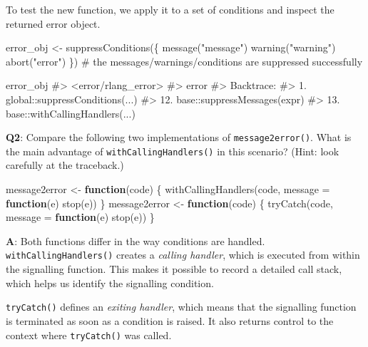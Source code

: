 \documentclass[
]{krantz}
\makeatletter
\newenvironment{Shaded}{\begin{snugshade}}{\end{snugshade}}
\newcommand{\CommentTok}[1]{\textcolor[rgb]{0.56,0.35,0.01}{\textit{#1}}}
\newcommand{\ControlFlowTok}[1]{\textcolor[rgb]{0.13,0.29,0.53}{\textbf{#1}}}
\newcommand{\DataTypeTok}[1]{\textcolor[rgb]{0.13,0.29,0.53}{#1}}
\newcommand{\KeywordTok}[1]{\textcolor[rgb]{0.13,0.29,0.53}{\textbf{#1}}}
\newcommand{\NormalTok}[1]{#1}
\newcommand{\StringTok}[1]{\textcolor[rgb]{0.31,0.60,0.02}{#1}}
\newenvironment{kframe}{%
\medskip{}
\setlength{\fboxsep}{.8em}
 \def\at@end@of@kframe{}%
 \ifinner\ifhmode%
  \def\at@end@of@kframe{\end{minipage}}%
  \begin{minipage}{\columnwidth}%
 \fi\fi%
 \def\FrameCommand##1{\hskip\@totalleftmargin \hskip-\fboxsep
 \colorbox{shadecolor}{##1}\hskip-\fboxsep
     \hskip-\linewidth \hskip-\@totalleftmargin \hskip\columnwidth}%
 \MakeFramed {\advance\hsize-\width
   \@totalleftmargin\z@ \linewidth\hsize
   \@setminipage}}%
 {\par\unskip\endMakeFramed%
 \at@end@of@kframe}
\renewenvironment{Shaded}{\begin{kframe}}{\end{kframe}}
\renewcommand{\KeywordTok} [1]{\textcolor[rgb]{0.00,0.44,0.13}{{#1}}}
\renewcommand{\DataTypeTok}[1]{\textcolor[rgb]{0.56,0.13,0.00}{{#1}}}
\renewcommand{\StringTok}  [1]{\textcolor[rgb]{0.25,0.44,0.63}{{#1}}}
\renewcommand{\CommentTok} [1]{\textcolor[rgb]{0.38,0.63,0.69}{{#1}}}
\renewcommand{\NormalTok}  [1]{{#1}}
\makeatother
\begin{document}
To test the new function, we apply it to a set of conditions and inspect the returned error object.

\begin{Shaded}
\begin{Highlighting}[]
\NormalTok{error_obj <-}\StringTok{ }\KeywordTok{suppressConditions}\NormalTok{(\{}
  \KeywordTok{message}\NormalTok{(}\StringTok{"message"}\NormalTok{)}
  \KeywordTok{warning}\NormalTok{(}\StringTok{"warning"}\NormalTok{)}
  \KeywordTok{abort}\NormalTok{(}\StringTok{"error"}\NormalTok{)}
\NormalTok{\})}
\CommentTok{# the messages/warnings/conditions are suppressed successfully}

\NormalTok{error_obj}
\CommentTok{#> <error/rlang_error>}
\CommentTok{#> error}
\CommentTok{#> Backtrace:}
\CommentTok{#>   1. global::suppressConditions(...)}
\CommentTok{#>  12. base::suppressMessages(expr)}
\CommentTok{#>  13. base::withCallingHandlers(...)}
\end{Highlighting}
\end{Shaded}

\textbf{{Q2}}: Compare the following two implementations of \texttt{message2error()}. What is the main advantage of \texttt{withCallingHandlers()} in this scenario? (Hint: look carefully at the traceback.)

\begin{Shaded}
\begin{Highlighting}[]
\NormalTok{message2error <-}\StringTok{ }\ControlFlowTok{function}\NormalTok{(code) \{}
  \KeywordTok{withCallingHandlers}\NormalTok{(code, }\DataTypeTok{message =} \ControlFlowTok{function}\NormalTok{(e) }\KeywordTok{stop}\NormalTok{(e))}
\NormalTok{\}}
\NormalTok{message2error <-}\StringTok{ }\ControlFlowTok{function}\NormalTok{(code) \{}
  \KeywordTok{tryCatch}\NormalTok{(code, }\DataTypeTok{message =} \ControlFlowTok{function}\NormalTok{(e) }\KeywordTok{stop}\NormalTok{(e))}
\NormalTok{\}}
\end{Highlighting}
\end{Shaded}

\textbf{{A}}: Both functions differ in the way conditions are handled. \texttt{withCallingHandlers()} creates a \emph{calling handler}, which is executed from within the signalling function. This makes it possible to record a detailed call stack, which helps us identify the signalling condition.

\texttt{tryCatch()} defines an \emph{exiting handler}, which means that the signalling function is terminated as soon as a condition is raised. It also returns control to the context where \texttt{tryCatch()} was called.
\end{document}
